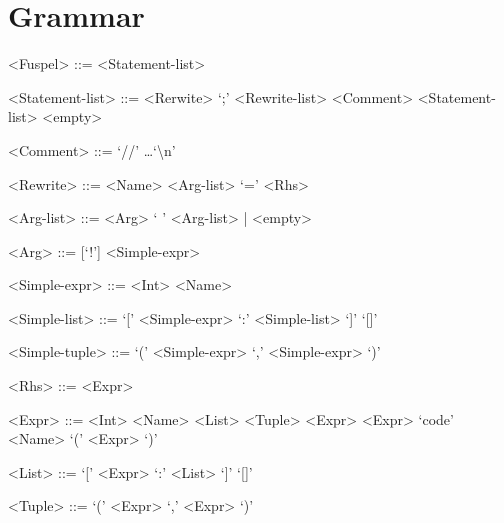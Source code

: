 \section{Grammar}
\label{sec:grammar}

\setlength{\grammarparsep}{4pt}
\setlength{\grammarindent}{10em}
\begin{grammar}
	<Fuspel> ::= <Statement-list>

	<Statement-list> ::= <Rerwite> `;' <Rewrite-list>
		\alt <Comment> <Statement-list>
		\alt <empty>

	<Comment> ::= `//' \dots `\textbackslash n'

	<Rewrite> ::= <Name> <Arg-list> `=' <Rhs>

	<Arg-list> ::= <Arg> ` ' <Arg-list> | <empty>

	<Arg> ::= [`!'] <Simple-expr>

	<Simple-expr> ::= <Int>
		\alt <Simple-list>
		\alt <Simple-tuple>

	<Simple-list> ::= `[' <Simple-expr> `:' <Simple-list> `]'
		\alt `[]'
	
	<Simple-tuple> ::= `(' <Simple-expr> `,' <Simple-expr> `)'

	<Rhs> ::= <Expr>

	<Expr> ::= <Int>
		\alt <Tuple>
		 <Expr>
		\alt `code' <Name>
		\alt `(' <Expr> `)'

	<List> ::= `[' <Expr> `:' <List> `]'
		\alt `[]'
	
	<Tuple> ::= `(' <Expr> `,' <Expr> `)'
\end{grammar}
